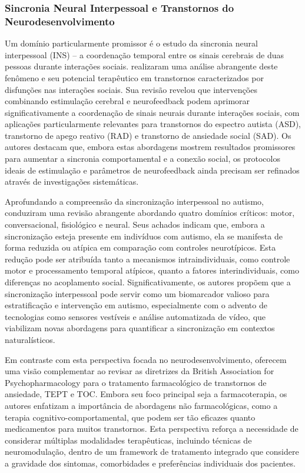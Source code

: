 \subsubsection{Sincronia Neural Interpessoal e Transtornos do Neurodesenvolvimento}
Um domínio particularmente promissor é o estudo da sincronia neural interpessoal (INS) – a coordenação temporal entre os sinais cerebrais de duas pessoas durante interações sociais.  realizaram uma análise abrangente deste fenômeno e seu potencial terapêutico em transtornos caracterizados por disfunções nas interações sociais. Sua revisão revelou que intervenções combinando estimulação cerebral e neurofeedback podem aprimorar significativamente a coordenação de sinais neurais durante interações sociais, com aplicações particularmente relevantes para transtornos do espectro autista (ASD), transtorno de apego reativo (RAD) e transtorno de ansiedade social (SAD). Os autores destacam que, embora estas abordagens mostrem resultados promissores para aumentar a sincronia comportamental e a conexão social, os protocolos ideais de estimulação e parâmetros de neurofeedback ainda precisam ser refinados através de investigações sistemáticas.

Aprofundando a compreensão da sincronização interpessoal no autismo,  conduziram uma revisão abrangente abordando quatro domínios críticos: motor, conversacional, fisiológico e neural. Seus achados indicam que, embora a sincronização esteja presente em indivíduos com autismo, ela se manifesta de forma reduzida ou atípica em comparação com controles neurotípicos. Esta redução pode ser atribuída tanto a mecanismos intraindividuais, como controle motor e processamento temporal atípicos, quanto a fatores interindividuais, como diferenças no acoplamento social. Significativamente, os autores propõem que a sincronização interpessoal pode servir como um biomarcador valioso para estratificação e intervenção em autismo, especialmente com o advento de tecnologias como sensores vestíveis e análise automatizada de vídeo, que viabilizam novas abordagens para quantificar a sincronização em contextos naturalísticos.

Em contraste com esta perspectiva focada no neurodesenvolvimento,  oferecem uma visão complementar ao revisar as diretrizes da British Association for Psychopharmacology para o tratamento farmacológico de transtornos de ansiedade, TEPT e TOC. Embora seu foco principal seja a farmacoterapia, os autores enfatizam a importância de abordagens não farmacológicas, como a terapia cognitivo-comportamental, que podem ser tão eficazes quanto medicamentos para muitos transtornos. Esta perspectiva reforça a necessidade de considerar múltiplas modalidades terapêuticas, incluindo técnicas de neuromodulação, dentro de um framework de tratamento integrado que considere a gravidade dos sintomas, comorbidades e preferências individuais dos pacientes.

